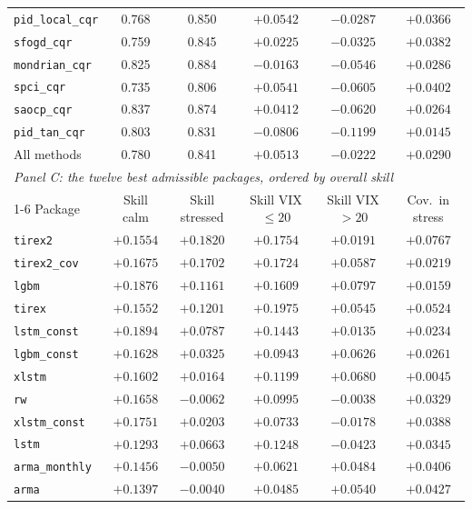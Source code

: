 \begin{table}[t]
\begin{tabular}{lccccc}
\texttt{pid\_local\_cqr}& 0.768 & 0.850 & $+0.0542$ & $-0.0287$ & $+0.0366$ \\
\texttt{sfogd\_cqr}     & 0.759 & 0.845 & $+0.0225$ & $-0.0325$ & $+0.0382$ \\
\texttt{mondrian\_cqr}  & 0.825 & 0.884 & $-0.0163$ & $-0.0546$ & $+0.0286$ \\
\texttt{spci\_cqr}      & 0.735 & 0.806 & $+0.0541$ & $-0.0605$ & $+0.0402$ \\
\texttt{saocp\_cqr}     & 0.837 & 0.874 & $+0.0412$ & $-0.0620$ & $+0.0264$ \\
\texttt{pid\_tan\_cqr}  & 0.803 & 0.831 & $-0.0806$ & $-0.1199$ & $+0.0145$ \\
\addlinespace
All methods & 0.780 & 0.841 & $+0.0513$ & $-0.0222$ & $+0.0290$ \\
\midrule
\multicolumn{6}{l}{\textit{Panel C: the twelve best admissible packages, ordered by overall skill}}\\
\cmidrule(lr){1-6}
Package & Skill calm & Skill stressed & Skill VIX $\leq 20$ & Skill VIX $> 20$ & Cov.\ in stress \\
\midrule
\texttt{tirex2}       & $+0.1554$ & $+0.1820$ & $+0.1754$ & $+0.0191$ & $+0.0767$ \\
\texttt{tirex2\_cov}  & $+0.1675$ & $+0.1702$ & $+0.1724$ & $+0.0587$ & $+0.0219$ \\
\texttt{lgbm}         & $+0.1876$ & $+0.1161$ & $+0.1609$ & $+0.0797$ & $+0.0159$ \\
\texttt{tirex}        & $+0.1552$ & $+0.1201$ & $+0.1975$ & $+0.0545$ & $+0.0524$ \\
\texttt{lstm\_const}  & $+0.1894$ & $+0.0787$ & $+0.1443$ & $+0.0135$ & $+0.0234$ \\
\texttt{lgbm\_const}  & $+0.1628$ & $+0.0325$ & $+0.0943$ & $+0.0626$ & $+0.0261$ \\
\texttt{xlstm}        & $+0.1602$ & $+0.0164$ & $+0.1199$ & $+0.0680$ & $+0.0045$ \\
\texttt{rw}           & $+0.1658$ & $-0.0062$ & $+0.0995$ & $-0.0038$ & $+0.0329$ \\
\texttt{xlstm\_const} & $+0.1751$ & $+0.0203$ & $+0.0733$ & $-0.0178$ & $+0.0388$ \\
\texttt{lstm}         & $+0.1293$ & $+0.0663$ & $+0.1248$ & $-0.0423$ & $+0.0345$ \\
\texttt{arma\_monthly}& $+0.1456$ & $-0.0050$ & $+0.0621$ & $+0.0484$ & $+0.0406$ \\
\texttt{arma}         & $+0.1397$ & $-0.0040$ & $+0.0485$ & $+0.0540$ & $+0.0427$ \\
\bottomrule
\end{tabular}


\end{table}
